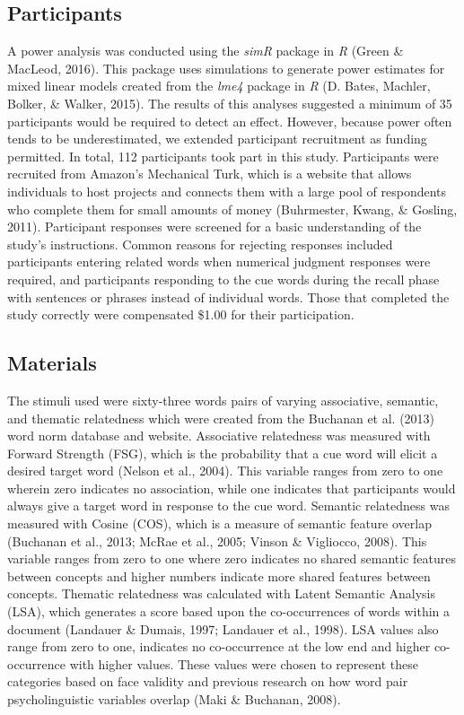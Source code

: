 \documentclass[english,man]{apa6}
\theoremstyle{definition}
\theoremstyle{definition}
\theoremstyle{remark}
\begin{document}
\subsection{Participants}\label{participants}

A power analysis was conducted using the \emph{simR} package in \emph{R}
(Green \& MacLeod, 2016). This package uses simulations to generate
power estimates for mixed linear models created from the \emph{lme4}
package in \emph{R} (D. Bates, Machler, Bolker, \& Walker, 2015). The
results of this analyses suggested a minimum of 35 participants would be
required to detect an effect. However, because power often tends to be
underestimated, we extended participant recruitment as funding
permitted. In total, 112 participants took part in this study.
Participants were recruited from Amazon's Mechanical Turk, which is a
website that allows individuals to host projects and connects them with
a large pool of respondents who complete them for small amounts of money
(Buhrmester, Kwang, \& Gosling, 2011). Participant responses were
screened for a basic understanding of the study's instructions. Common
reasons for rejecting responses included participants entering related
words when numerical judgment responses were required, and participants
responding to the cue words during the recall phase with sentences or
phrases instead of individual words. Those that completed the study
correctly were compensated \$1.00 for their participation.

\subsection{Materials}\label{materials}

The stimuli used were sixty-three words pairs of varying associative,
semantic, and thematic relatedness which were created from the Buchanan
et al. (2013) word norm database and website. Associative relatedness
was measured with Forward Strength (FSG), which is the probability that
a cue word will elicit a desired target word (Nelson et al., 2004). This
variable ranges from zero to one wherein zero indicates no association,
while one indicates that participants would always give a target word in
response to the cue word. Semantic relatedness was measured with Cosine
(COS), which is a measure of semantic feature overlap (Buchanan et al.,
2013; McRae et al., 2005; Vinson \& Vigliocco, 2008). This variable
ranges from zero to one where zero indicates no shared semantic features
between concepts and higher numbers indicate more shared features
between concepts. Thematic relatedness was calculated with Latent
Semantic Analysis (LSA), which generates a score based upon the
co-occurrences of words within a document (Landauer \& Dumais, 1997;
Landauer et al., 1998). LSA values also range from zero to one,
indicates no co-occurrence at the low end and higher co-occurrence with
higher values. These values were chosen to represent these categories
based on face validity and previous research on how word pair
psycholinguistic variables overlap (Maki \& Buchanan, 2008).
\end{document}
